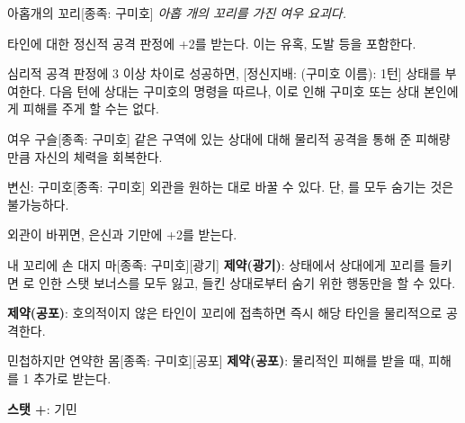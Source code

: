 \documentclass{report}
\begin{document}
	\begin{story}{아홉개의 꼬리}{[종족: 구미호]}
		\textit{아홉 개의 꼬리를 가진 여우 요괴다.}
		
		타인에 대한 정신적 공격 판정에 +2를 받는다. 이는 유혹, 도발 등을 포함한다.
		
		심리적 공격 판정에 3 이상 차이로 성공하면, [정신지배: (구미호 이름): 1턴] 상태를 부여한다. 다음 턴에 상대는 구미호의 명령을 따르나, 이로 인해 구미호 또는 상대 본인에게 피해를 주게 할 수는 없다.
		
	\end{story}

	\begin{story}{여우 구슬}{[종족: 구미호]}
		같은 구역에 있는 상대에 대해 물리적 공격을 통해 준 피해량만큼 자신의 체력을 회복한다.
		
	\end{story}
	
	\begin{story}{변신: 구미호}{[종족: 구미호]}
		외관을 원하는 대로 바꿀 수 있다. 단, 를 모두 숨기는 것은 불가능하다.
		
		외관이 바뀌면, 은신과 기만에 +2를 받는다.
		
	\end{story}
	
	\begin{story}{내 꼬리에 손 대지 마}{[종족: 구미호][광기]}
		\textbf{제약(광기)}:  상태에서 상대에게 꼬리를 들키면 로 인한 스탯 보너스를 모두 잃고, 들킨 상대로부터 숨기 위한 행동만을 할 수 있다.
		
		\smallskip
		
		\textbf{제약(공포)}: 호의적이지 않은 타인이 꼬리에 접촉하면 즉시 해당 타인을 물리적으로 공격한다.
		
	\end{story}
	
	\begin{story}{민첩하지만 연약한 몸}{[종족: 구미호][공포]}
		\textbf{제약(공포)}: 물리적인 피해를 받을 때, 피해를 1 추가로 받는다.
		
		\smallskip
		
		\textbf{스탯 +}: 기민
		
		\smallskip
		
	\end{story}
	
\end{document}
